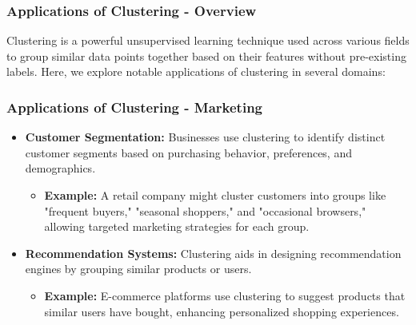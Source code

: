 \documentclass[aspectratio=169]{beamer}
\begin{document}
\begin{frame}[fragile]
    \frametitle{Applications of Clustering - Overview}
    Clustering is a powerful unsupervised learning technique used across various fields to group similar data points together based on their features without pre-existing labels. Here, we explore notable applications of clustering in several domains:
\end{frame}

\begin{frame}[fragile]
    \frametitle{Applications of Clustering - Marketing}
    \begin{itemize}
        \item \textbf{Customer Segmentation:} Businesses use clustering to identify distinct customer segments based on purchasing behavior, preferences, and demographics.
        \begin{itemize}
            \item \textbf{Example:} A retail company might cluster customers into groups like "frequent buyers," "seasonal shoppers," and "occasional browsers," allowing targeted marketing strategies for each group.
        \end{itemize}
        
        \item \textbf{Recommendation Systems:} Clustering aids in designing recommendation engines by grouping similar products or users.
        \begin{itemize}
            \item \textbf{Example:} E-commerce platforms use clustering to suggest products that similar users have bought, enhancing personalized shopping experiences.
        \end{itemize}
    \end{itemize}
\end{frame}
\end{document}
